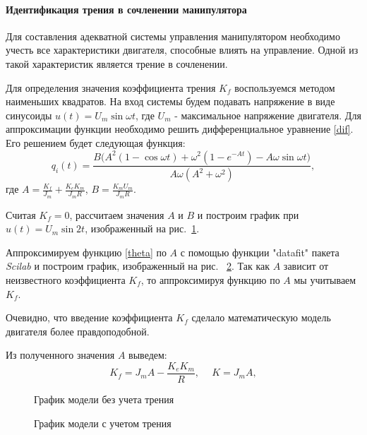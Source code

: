 \paragraph*{Идентификация трения в сочленении манипулятора\\}
\hspace*{\parindent}Для составления адекватной системы управления манипулятором необходимо учесть все характеристики двигателя, способные влиять на управление. Одной из такой характеристик является трение в сочленении.  

Для определения значения коэффициента трения $K_f$ воспользуемся методом наименьших квадратов. На вход системы будем подавать напряжение в виде синусоиды $u(t) = U_m\sin{{\omega}t}$, где $U_m$ - максимальное напряжение двигателя. Для аппроксимации функции необходимо решить дифференциальное уравнение \eqref{dif}. Его решением будет следующая функция:
\begin{equation}\label{theta}
	q_i(t)=\frac{B(A^2(1-\cos{{\omega}}t)+\omega^2(1-e^{-At})-A\omega\sin{{\omega}t)}}{A\omega(A^2+\omega^2)},
\end{equation}где $A=\frac{K_f}{J_m}+\frac{K_eK_m}{J_mR}$, $B=\frac{K_mU_m}{J_mR}$.

Считая $K_f = 0$, рассчитаем значения $A$ и $B$ и построим график при $u(t) = U_m\sin{2t}$, изображенный на рис.~\ref{nofr}.

Аппроксимируем функцию \eqref{theta} по $A$ с помощью функции "datafit" пакета \textit{Scilab} и построим график, изображенный на рис.~ \ref{yesfr}. Так как $A$ зависит от неизвестного коэффициента $K_f$, то аппроксимируя функцию по $A$ мы учитываем $K_f$. 

Очевидно, что введение коэффициента $K_f$ сделало математическую модель двигателя более правдоподобной.

Из полученного значения $A$ выведем:
\begin{equation}
	K_f = J_mA-\frac{K_eK_m}{R}, \phantom{-} K=J_mA,
\end{equation}

\begin{figure}[h]
	\noindent{}
	\caption{График модели без учета трения}
	\label{nofr}
\end{figure}

\begin{figure}[h]
	\noindent{}
	\caption{График модели с учетом трения}
	\label{yesfr}
\end{figure}
